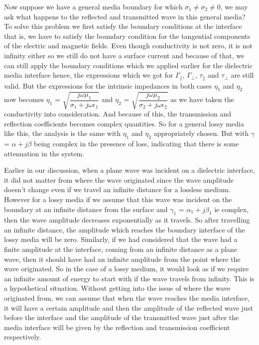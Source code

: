 Now suppose we have a general media boundary for which $\sigma_1 \neq \sigma_2 \neq 0$, we may ask what happens to the reflected and transmitted wave in this general media? To solve this problem we first satisfy the boundary conditions at the interface that is, we have to satisfy the boundary condition for the tangential components of the electric and magnetic fields. Even though conductivity is not zero, it is not infinity either so we still do not have a surface current and because of that, we can still apply the boundary conditions which we applied earlier for the dielectric media interface hence, the expressions which we got for $\Gamma_\parallel$, $\Gamma_\perp$, $\tau_\parallel$ and $\tau_\perp$ are still valid.  But the expressions for the intrinsic impedances in both cases $\eta_1$ and $\eta_2$ now becomes $\eta_1$ = $\sqrt{\dfrac{j\omega\mu_1}{\sigma_1 + j\omega\epsilon_1}}$ and $\eta_2$ = $\sqrt{\dfrac{j\omega\mu_2}{\sigma_2 + j\omega\epsilon_2}}$ as we have taken the conductivity into consideration. And because of this, the transmission and reflection coefficients becomes complex quantities.
So for a general lossy media like this, the analysis is the same with $\eta_1$ and $\eta_2$ appropriately chosen. But with $\gamma$ = $\alpha + j\beta$ being complex in the presence of loss, indicating that there is some attenuation in the system. 

Earlier in our discussion, when a plane wave was incident on a dielectric interface, it did not matter from where the wave originated since the wave amplitude doesn't change even if we travel an infinite distance for a lossless medium. However for a lossy media if we assume that this wave was incident on the boundary at an infinite distance from the surface and $\gamma_1$ = $\alpha_1 + j\beta_1$ ie complex, then the wave amplitude decreases exponentially as it travels. So after travelling an infinite distance, the amplitude which reaches the boundary interface of the lossy media will be zero. Similarly, if we had considered that the wave had a finite amplitude at the interface, coming from an infinite distance as a plane wave, then it should have had an infinite amplitude from the point where the wave originated. So in the case of a lossy medium, it would look as if we require an infinite amount of energy to start with if the wave travels from infinity. This is a hypothetical situation. Without getting into the issue of where the wave originated from, we can assume that when the wave reaches the media interface, it will have a certain amplitude and then the amplitude of the reflected wave just before the interface and the amplitude of the transmitted wave just after the media interface will be given by the reflection and transmission coefficient respectively. 

